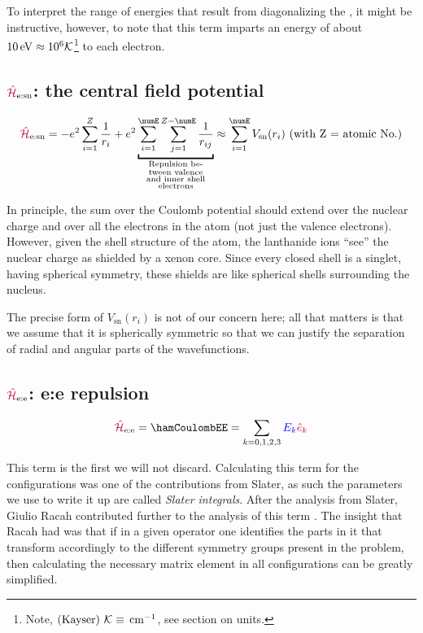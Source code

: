 \documentclass[11pt, twoside,openright]{article}
\begin{document}
    To interpret the range of energies that result from diagonalizing the \hamilton, it might be instructive, however, to note that this term imparts an energy of about $10\,\text{eV} \approx 10^6 \mathcal{K}$\footnote{Note, $\text{(Kayser) }\mathcal{K} \equiv \,\text{cm}^{-1}$, see section on units.} to each electron.

\subsection{$\textcolor{purple}{\hat{\mathcal{H}}}_\text{e:sn}$: the central field potential}

\begin{equation}
\hamNuclearCoulombSymbol = -e^2 \sum_{i=1}^{Z} \frac{1}{r_{i}} + e^2 \underbracket{\sum_{i=1}^{\numE}\sum_{j=1}^{Z-\numE} \frac{1}{r_{ij}}}_{\substack{
        \text{Repulsion be-} \\
        \text{tween valence} \\
        \text{and inner shell} \\
        \text{electrons} 
        }
      } \approx \sum_{i=1}^\numE V_\text{sn}(r_i) \text{ (with Z = atomic No.)}
\end{equation}


In principle, the sum over the Coulomb potential should extend over the nuclear charge and over all the electrons in the atom (not just the valence electrons). However, given the shell structure of the atom, the lanthanide ions ``see'' the nuclear charge as shielded by a xenon core. Since every closed shell is a singlet, having spherical symmetry, these shields are like spherical shells surrounding the nucleus.

	The precise form of $V_\text{sn}(r_i)$ is not of our concern here; all that matters is that we assume that it is spherically symmetric so that we can justify the separation of radial and angular parts of the wavefunctions.

\subsection{$\textcolor{purple}{\hat{\mathcal{H}}}_\text{e:e}$: e:e repulsion}
 
    \begin{equation}
        \hamCoulombEESymbol = \hamCoulombEE = \sum_{k=0,1,2,3} \Ek{k} \ek{k}
    \end{equation}  

    This term is the first we will not discard. Calculating this term for the \fn configurations was one of the contributions from Slater, as such the parameters we use to write it up are called \textit{Slater integrals}. After the analysis from Slater, Giulio Racah contributed further to the analysis of this term \cite{racah_theory_1949}. The insight that Racah had was that if in a given operator one identifies the parts in it that transform accordingly to the different symmetry groups present in the problem, then calculating the necessary matrix element in all \fn configurations can be greatly simplified.
\end{document}
